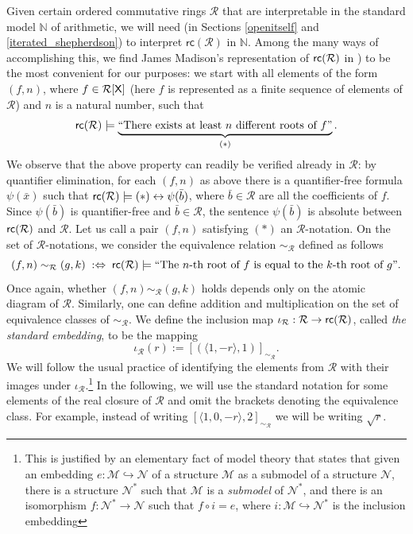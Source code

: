\documentclass{amsart}
\newcommand{\mc}[1]{\mathcal #1}
\newcommand{\tupel}[1]{{\langle #1 \rangle}}
\newcommand{\Iff}{\Leftrightarrow}
\newcommand{\X}{{\sf X}}
\begin{document}
Given certain ordered commutative rings $\mc R$ that are interpretable in the standard model $\mathbb{N}$ of arithmetic, we will need (in Sections \ref{openitself} and \ref{iterated_shepherdson}) to interpret $\mathsf{rc}(\mc R)$ in $\mathbb{N}$. Among the many ways of accomplishing this, we find James Madison's representation of ${\sf rc}(\mc R)$ in 
\cite{madison:comrcf70}) to be the most convenient for our purposes:
we start with all elements of the form $(f,n)$, where $f\in \mc R[\X]$ 
(here $f$ is represented as a finite sequence of elements of $\mc R$) and $n$ is a natural number, such that
\[{\sf rc}(\mc R)\models \underbrace{``\textnormal{There exists at least $n$ different roots of $f$}"}_{(*)}.\]
We observe that the above property can readily be verified already in $\mc R$: by quantifier elimination, for each $(f,n)$ 
as above there is a quantifier-free formula $\psi(\bar{x})$ such that 
${\sf rc}(\mc R)\models {(*)}\leftrightarrow \psi(\bar{b})$,
where $\bar{b}\in \mc R$ are all the coefficients of $f$. Since $\psi(\bar{b})$ is quantifier-free and $\bar{b}\in\mc  R$, the sentence $\psi(\bar{b})$ 
is absolute between ${\sf rc}(\mc R)$ and $\mc R$.  Let us call a pair $(f,n)$ satisfying $(*)$ an $\mc R$-notation. 
On the set of $\mc R$-notations, we consider the equivalence relation $\sim_{\mc R}$ defined as follows
\[(f,n) \sim_{\mc R} (g,k) \;:\Iff\; {\sf rc}(\mc R)\models ``\textnormal{The $n$-th root of $f$ is equal to the $k$-th root of $g$}".\]
Once again, whether $(f,n) \sim_{\mc R} (g,k)$ holds depends only on the atomic diagram of $\mc R$. 
Similarly, one can define addition and multiplication on the set of equivalence classes of $\sim_{\mc R}$. 
We define the inclusion map $\iota_{\mc R}: {\mc R}\rightarrow {\sf rc}(\mc R)$, called \textit{the standard embedding},  to be the mapping
\[\iota_{\mc R}(r):= [(\tupel{1,-r},1)]_{\sim_{\mc R}}.\]
We will follow the usual practice of identifying the elements from $\mc R$ 
with their images under $\iota_{\mc R}$.\footnote{This
is justified by an elementary fact of model theory that states that given an embedding 
$e:\mathcal{M}\hookrightarrow \mathcal{N}$ of a structure $\mathcal{M}$ as a submodel of a 
structure $\mathcal{N}$, there is a structure $\mathcal{N}^*$ such that $\mathcal{M}$ is a 
\emph{submodel} of $\mathcal{N}^*$, and there is an isomorphism 
$f:\mathcal{N}^{*} \rightarrow \mathcal{N}$ such that $f\circ i = e$, where 
$i:\mathcal{M} \hookrightarrow \mathcal{N}^{*}$ is the inclusion embedding} 
In the following, we will use the standard notation for some elements of the 
real closure of $\mc R$ and omit the brackets denoting the equivalence class. For example, instead of writing 
$[\tupel{1,0,-r},2]_{\sim_{\mc R}}$ we will be writing $\sqrt{r}$.
\end{document}
